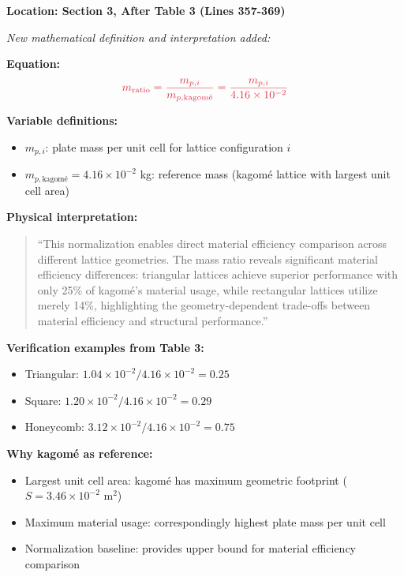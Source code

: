 \documentclass[11pt,a4paper]{article}
\newenvironment{changesbox}{%
    \par\medskip\noindent{\color{changescolor}\rule{\linewidth}{2pt}}\par
    \noindent{\color{changescolor}\bfseries Manuscript Changes}\par\smallskip
}{%
    \par\noindent{\color{changescolor}\rule{\linewidth}{0.5pt}}\medskip
}
\begin{document}
\begin{changesbox}
\textbf{Location: Section 3, After Table 3 (Lines 357-369)}

\textit{New mathematical definition and interpretation added:}

\textbf{Equation:}
\begin{equation}
\textcolor{redtext}{m_{\text{ratio}} = \frac{m_{p,i}}{m_{p,\text{kagomé}}} = \frac{m_{p,i}}{4.16 \times 10^{-2}}}
\end{equation}

\textbf{Variable definitions:}
\begin{itemize}
    \item $m_{p,i}$: plate mass per unit cell for lattice configuration $i$
    \item $m_{p,\text{kagomé}} = 4.16 \times 10^{-2}$ kg: reference mass (kagomé lattice with largest unit cell area)
\end{itemize}

\textbf{Physical interpretation:}
\begin{quote}
\textcolor{redtext}{``This normalization enables direct material efficiency comparison across different lattice geometries. The mass ratio reveals significant material efficiency differences: triangular lattices achieve superior performance with only 25\% of kagomé's material usage, while rectangular lattices utilize merely 14\%, highlighting the geometry-dependent trade-offs between material efficiency and structural performance.''}
\end{quote}

\textbf{Verification examples from Table 3:}
\begin{itemize}
    \item Triangular: $1.04 \times 10^{-2} / 4.16 \times 10^{-2} = 0.25$ \checkmark
    \item Square: $1.20 \times 10^{-2} / 4.16 \times 10^{-2} = 0.29$ \checkmark
    \item Honeycomb: $3.12 \times 10^{-2} / 4.16 \times 10^{-2} = 0.75$ \checkmark
\end{itemize}

\textbf{Why kagomé as reference:}
\begin{itemize}
    \item Largest unit cell area: kagomé has maximum geometric footprint ($S = 3.46 \times 10^{-2}$ m$^2$)
    \item Maximum material usage: correspondingly highest plate mass per unit cell
    \item Normalization baseline: provides upper bound for material efficiency comparison
\end{itemize}
\end{changesbox}
\end{document}

